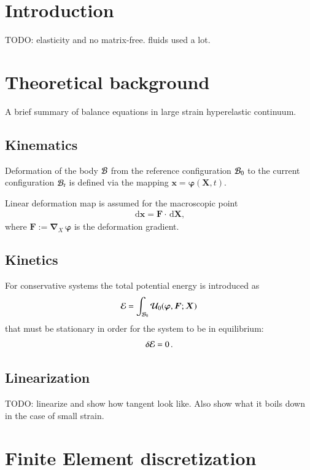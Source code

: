 \documentclass[preprint,12pt,times]{elsarticle}
\def\gz  #1{           \mbox{$\boldsymbol{#1}$}}
\def\d {\,\mbox{d}}
\def\mcl  #1{               {\cal #1}}
\begin{document}
\section{Introduction}

TODO: elasticity and no matrix-free. fluids used a lot.

\section{Theoretical background}

A brief summary of balance equations in large strain hyperelastic continuum.

\subsection{Kinematics}

Deformation of the body $\mcl B$ from the reference configuration $\mcl B_0$ to the current configuration $\mcl B_t$
is defined via the mapping $\gz x = \gz \varphi (\gz X,t)$.

Linear deformation map is assumed for the macroscopic point
\begin{align}
\d \gz x = \gz F \cdot \d \gz X,
\end{align}
where $\gz F := \gz \nabla_{X} \, \gz \varphi$ is the deformation gradient.

\subsection{Kinetics}

For conservative systems the total potential energy is introduced as
\begin{align}
\mcl E = \int_{\mcl B_0} \mcl U_0(\gz \varphi, \gz F; \gz X) \,
\end{align}
that must be stationary in order for the system to be in equilibrium:
\begin{align}
\delta \mcl E = 0 \, .
\label{eq:stationary}
\end{align}

\subsection{Linearization}

TODO: linearize and show how tangent look like.
Also show what it boils down in the case of small strain.

\section{Finite Element discretization}
\end{document}
